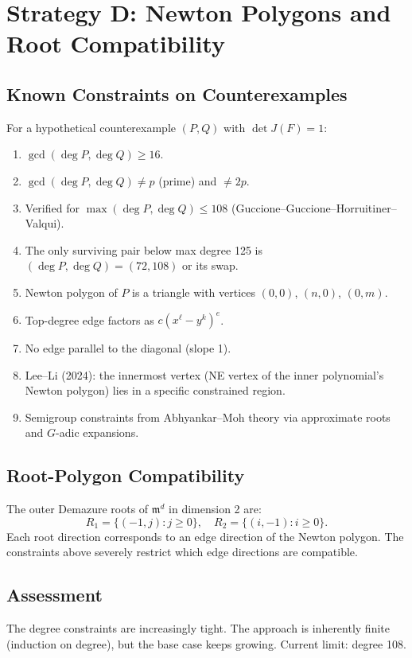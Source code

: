 \documentclass[12pt,a4paper]{article}
\theoremstyle{definition}
\newcommand{\pp}{\mathfrak{m}}
\begin{document}
\section{Strategy D: Newton Polygons and Root Compatibility}

\subsection{Known Constraints on Counterexamples}

For a hypothetical counterexample $(P, Q)$ with $\det J(F) = 1$:

\begin{enumerate}
\item $\gcd(\deg P, \deg Q) \geq 16$.
\item $\gcd(\deg P, \deg Q) \neq p$ (prime) and $\neq 2p$.
\item Verified for $\max(\deg P, \deg Q) \leq 108$ (Guccione--Guccione--Horruitiner--Valqui).
\item The only surviving pair below max degree 125 is $(\deg P, \deg Q) = (72, 108)$
  or its swap.
\item Newton polygon of $P$ is a triangle with vertices $(0,0)$, $(n,0)$, $(0,m)$.
\item Top-degree edge factors as $c(x^\ell - y^k)^e$.
\item No edge parallel to the diagonal (slope 1).
\item Lee--Li (2024): the innermost vertex (NE vertex of the inner polynomial's
  Newton polygon) lies in a specific constrained region.
\item Semigroup constraints from Abhyankar--Moh theory via approximate roots and
  $G$-adic expansions.
\end{enumerate}

\subsection{Root-Polygon Compatibility}
The outer Demazure roots of $\pp^d$ in dimension 2 are:
\[
  R_1 = \{(-1, j) : j \geq 0\}, \quad R_2 = \{(i, -1) : i \geq 0\}.
\]
Each root direction corresponds to an edge direction of the Newton polygon.
The constraints above severely restrict which edge directions are compatible.

\subsection{Assessment}
The degree constraints are increasingly tight. The approach is inherently finite
(induction on degree), but the base case keeps growing. Current limit: degree 108.
\end{document}
